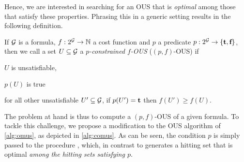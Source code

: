 Hence, we are interested in searching for an OUS that is \emph{optimal} among those that satisfy these properties. 
Phrasing this in a generic setting results in the following definition.

\begin{definition}
    If $\mathcal{G} $ is a formula, $f:2^{\mathcal{G} } \to \mathbb{N}$ a cost function and  $p$ a predicate $p: 2^{\mathcal{G} }\to \{\textbf{t},\textbf{f}\}$, then we call a set $U\subseteq \mathcal{G} $ a \emph{$p$-constrained $f$-OUS} ($(p,f)$-OUS) if \begin{compactitem}                                                                                                                                                                                                                         
    \item $U$ is unsatisfiable,
    \item $p(U)$ is true
    \item for all other unsatisfiable $U'\subseteq \mathcal{G} $, if $p(U')=\textbf{t}$ then   $f(U')\geq f(U)$.                                                                                                                                                                                                                         \end{compactitem}
\end{definition}

The problem at hand is thus to compute a $(p,f)$-OUS of a given formula. 
To tackle this challenge, we propose a modification to the OUS algorithm of \cref{alg:omus}, as depicted in \cref{alg:comus}. 
As can be seen, the condition $p$ is simply passed to the procedure \cohs, which, in contrast to \ohs generates a hitting set that is optimal \emph{among the hitting sets satisfying $p$}.

